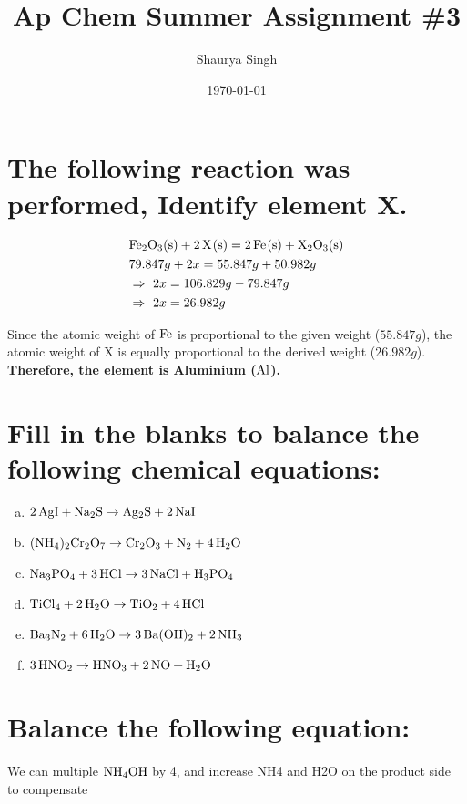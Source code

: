 \documentclass{scrartcl}
\author{Shaurya Singh}
\date{\today}
\title{Ap Chem Summer Assignment \#3}
\begin{document}
\maketitle

\section{The following reaction was performed, Identify element X.}
\label{sec:orge87219d}
\begin{align*}
  &\ce{Fe2O_3(s)}+\ce{2X(s)} = \ce{2Fe(s) + X_2O_3(s)}\\
  &79.847g+2x=55.847g+50.982g\\
  &\Rightarrow\ 2x=106.829g-79.847g\\
  &\Rightarrow\ 2x=26.982g\\
\end{align*}

Since the atomic weight of \(\ce{Fe}\) is proportional to the given weight
(\(55.847g\)), the atomic weight of X is equally proportional to the derived
weight (\(26.982g\)). \textbf{Therefore, the element is Aluminium (\(\ce{Al}\)).}

\section{Fill in the blanks to balance the following chemical equations:}
\label{sec:orgb8d5c34}
\begin{enumerate}[a.]
\item \(\ce{2AgI + Na2S} \rightarrow \ce{Ag2S + 2NaI}\)
\item \(\ce{(NH4)2Cr2O7} \rightarrow \ce{Cr2O3}+\ce{N2}+\ce{4H2O}\)
\item \(\ce{Na3PO4}+\ce{3HCl} \rightarrow \ce{3NaCl}+\ce{H3PO4}\)
\item \(\ce{TiCl4}+\ce{2H2O} \rightarrow \ce{TiO2}+\ce{4HCl}\)
\item \(\ce{Ba3N2}+\ce{6H2O} \rightarrow \ce{3Ba(OH)2}+\ce{2NH3}\)
\item \(\ce{3HNO2} \rightarrow \ce{HNO3}+\ce{2NO}+\ce{H2O}\)
\end{enumerate}

\section{Balance the following equation:}
\label{sec:org718af5d}
We can multiple \(\ce{NH4OH}\) by 4, and increase NH4 and H2O on the product
side to compensate
\end{document}
